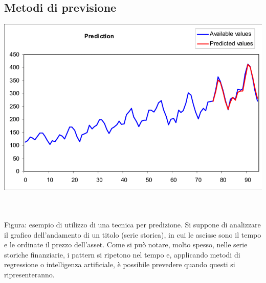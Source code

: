 \documentclass[a4paper,12pt]{report}
\begin{document}
\subsection{Metodi di previsione}

\begin{fig}
	\includegraphics[width=15cm]{time_series}
	\caption{\\~\\Figura: esempio di utilizzo di una tecnica per predizione. Si suppone di analizzare il grafico dell'andamento di un titolo (serie storica), in cui le ascisse sono il tempo e le ordinate il prezzo dell'asset. Come si può notare, molto spesso, nelle serie storiche finanziarie, i pattern si ripetono nel tempo e, applicando metodi di regressione o intelligenza artificiale, è possibile prevedere quando questi si ripresenteranno.}
\end{fig}
\end{document}
